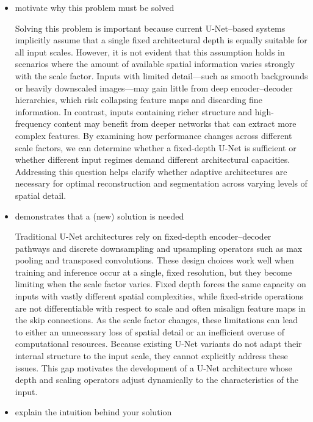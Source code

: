 \begin{itemize}



\item motivate why this problem must be solved

Solving this problem is important because current U-Net–based systems implicitly assume that a single fixed architectural depth is equally suitable for all input scales. However, it is not evident that this assumption holds in scenarios where the amount of available spatial information varies strongly with the scale factor. Inputs with limited detail—such as smooth backgrounds or heavily downscaled images—may gain little from deep encoder–decoder hierarchies, which risk collapsing feature maps and discarding fine information. In contrast, inputs containing richer structure and high-frequency content may benefit from deeper networks that can extract more complex features. By examining how performance changes across different scale factors, we can determine whether a fixed-depth U-Net is sufficient or whether different input regimes demand different architectural capacities. Addressing this question helps clarify whether adaptive architectures are necessary for optimal reconstruction and segmentation across varying levels of spatial detail.


\item demonstrates that a (new) solution is needed

Traditional U-Net architectures rely on fixed-depth encoder–decoder pathways and discrete downsampling and upsampling operators such as max pooling and transposed convolutions. These design choices work well when training and inference occur at a single, fixed resolution, but they become limiting when the scale factor varies. Fixed depth forces the same capacity on inputs with vastly different spatial complexities, while fixed-stride operations are not differentiable with respect to scale and often misalign feature maps in the skip connections. As the scale factor changes, these limitations can lead to either an unnecessary loss of spatial detail or an inefficient overuse of computational resources. Because existing U-Net variants do not adapt their internal structure to the input scale, they cannot explicitly address these issues. This gap motivates the development of a U-Net architecture whose depth and scaling operators adjust dynamically to the characteristics of the input.


\item explain the intuition behind your solution


\end{itemize}
